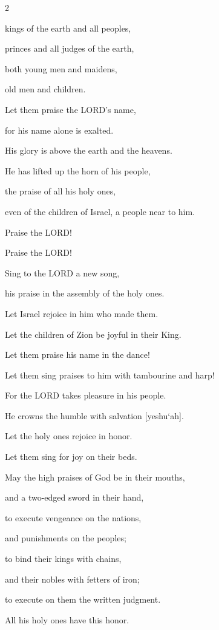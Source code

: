 \begin{multicols}{2}
	
	\myverse{}kings of the earth and all peoples,
	
	princes and all judges of the earth,
	
	
	\myverse{}both young men and maidens,
	
	old men and children.
	
	
	\myverse{}Let them praise the LORD’s name,
	
	for his name alone is exalted.
	
	His glory is above the earth and the heavens.
	
	
	\myverse{}He has lifted up the horn of his people,
	
	the praise of all his holy ones,
	
	even of the children of Israel, a people near to him.
	
	Praise the LORD!
	
	
	
	\mychapter{}\myverse*{}Praise the LORD!
	
	\quad\quad\quad Sing to the LORD a new song,
	
	his praise in the assembly of the holy ones.
	
	
	\myverse{}Let Israel rejoice in him who made them.
	
	Let the children of Zion be joyful in their King.
	
	
	\myverse{}Let them praise his name in the dance!
	
	Let them sing praises to him with tambourine and harp!
	
	
	\myverse{}For the LORD takes pleasure in his people.
	
	He crowns the humble with salvation [yeshu`ah].
	
	
	\myverse{}Let the holy ones rejoice in honor.
	
	Let them sing for joy on their beds.
	
	
	\myverse{}May the high praises of God be in their mouths,
	
	and a two-edged sword in their hand,
	
	
	\myverse{}to execute vengeance on the nations,
	
	and punishments on the peoples;
	
	
	\myverse{}to bind their kings with chains,
	
	and their nobles with fetters of iron;
	
	
	\myverse{}to execute on them the written judgment.
	
	All his holy ones have this honor.
	

\end{multicols}
